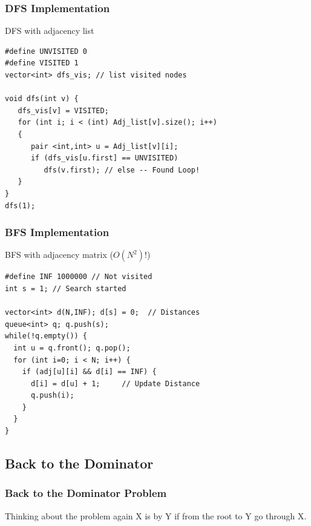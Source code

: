 \begin{frame}[fragile]
  \frametitle{DFS Implementation}
  \begin{exampleblock}{DFS with adjacency list}
\begin{verbatim}
#define UNVISITED 0
#define VISITED 1
vector<int> dfs_vis; // list visited nodes

void dfs(int v) {
   dfs_vis[v] = VISITED;
   for (int i; i < (int) Adj_list[v].size(); i++)
   {
      pair <int,int> u = Adj_list[v][i];
      if (dfs_vis[u.first] == UNVISITED)
         dfs(v.first); // else -- Found Loop!
   }
}
dfs(1);
\end{verbatim}
  \end{exampleblock}
\end{frame}

\begin{frame}[fragile]
  \frametitle{BFS Implementation}
  \begin{exampleblock}{BFS with adjacency matrix ($O(N^2)$!)}
\begin{verbatim}
#define INF 1000000 // Not visited
int s = 1; // Search started

vector<int> d(N,INF); d[s] = 0;  // Distances
queue<int> q; q.push(s);
while(!q.empty()) {
  int u = q.front(); q.pop();
  for (int i=0; i < N; i++) {
    if (adj[u][i] && d[i] == INF) {
      d[i] = d[u] + 1;     // Update Distance
      q.push(i);
    }
  }
}
\end{verbatim}
  \end{exampleblock}
\end{frame}

\subsection{Back to the Dominator}

\begin{frame}[fragile]
  \frametitle{Back to the Dominator Problem}

  {\smaller
  \begin{exampleblock}{Thinking about the problem again}
    X is  by Y if  from
    the root to Y go through X.

    \bigskip
  \end{exampleblock}}

  \begin{center}
  \end{center}
\end{frame}

